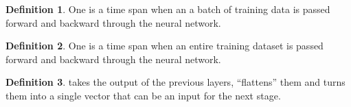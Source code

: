 \documentclass[a4paper]{article}
\theoremstyle{definition}
\newtheorem{definition}{Definition}
\theoremstyle{plain}
\begin{document}
\begin{definition}
One  is a time span when an a batch of training data is passed forward and backward through the neural network.
\end{definition}

\begin{definition}
One  is a time span when an entire training dataset is passed forward and backward through the neural network.
\end{definition}

\begin{definition}
 takes the output of the previous layers, ``flattens'' them and turns them into a single vector that can be an input for the next stage.
\end{definition}
\end{document}
